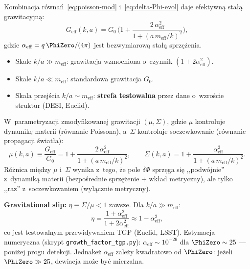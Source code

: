\begin{theorem}\label{thm:Geff-k}
Kombinacja r\'owna\'n~\eqref{eq:poisson-mod}
i~\eqref{eq:delta-Phi-evol} daje efektywn\k{a} sta\l{}\k{a}
grawitacyjn\k{a}:
\begin{equation}\label{eq:Geff-k}
  \boxed{
    G_{\mathrm{eff}}(k, a)
    = G_0\,\biggl(1 + \frac{2\,\alpha_{\mathrm{eff}}^2}
    {1 + (a\,m_{\mathrm{eff}}/k)^2}\biggr),
  }
\end{equation}
gdzie $\alpha_{\mathrm{eff}} = q\,\PhiZero/(4\pi)$ jest
bezwymiarow\k{a} sta\l{}\k{a} sprz\k{e}\.zenia.
\begin{itemize}[nosep]
  \item Skale $k/a \gg m_{\mathrm{eff}}$: grawitacja
        wzmocniona o~czynnik $(1 + 2\alpha_{\mathrm{eff}}^2)$.
  \item Skale $k/a \ll m_{\mathrm{eff}}$: standardowa
        grawitacja $G_0$.
  \item Skala przej\'scia $k/a \sim m_{\mathrm{eff}}$:
        \textbf{strefa testowalna} przez dane o~wzro\'scie
        struktur (DESI, Euclid).
\end{itemize}
\end{theorem}

\begin{corollary}\label{cor:grav-slip}
W~parametryzacji zmodyfikowanej grawitacji $(\mu, \Sigma)$, gdzie
$\mu$ kontroluje dynamik\k{e} materii (r\'ownanie Poissona),
a~$\Sigma$ kontroluje soczewkowanie (r\'ownanie propagacji \'swiat\l{}a):
\begin{equation}\label{eq:mu-sigma}
  \mu(k,a) \equiv \frac{G_{\mathrm{eff}}}{G_0}
  = 1 + \frac{2\,\alpha_{\mathrm{eff}}^2}{1 + (a\,m_{\mathrm{eff}}/k)^2},
  \qquad
  \Sigma(k,a)
  = 1 + \frac{\alpha_{\mathrm{eff}}^2}{1 + (a\,m_{\mathrm{eff}}/k)^2}.
\end{equation}
R\'o\.znica mi\k{e}dzy $\mu$ i~$\Sigma$ wynika z~tego, \.ze pole
$\delta\Phi$ sprz\k{e}ga si\k{e} ,,podw\'ojnie'' z~dynamik\k{a}
materii (bezpo\'srednie sprz\k{e}\.zenie + wk\l{}ad metryczny),
ale tylko ,,raz'' z~soczewkowaniem (wy\l{}\k{a}cznie metryczny).

\textbf{Gravitational slip:}
$\eta \equiv \Sigma/\mu < 1$ zawsze. Dla $k/a \gg m_{\mathrm{eff}}$:
\begin{equation}\label{eq:slip}
  \eta = \frac{1 + \alpha_{\mathrm{eff}}^2}{1 + 2\alpha_{\mathrm{eff}}^2}
  \approx 1 - \alpha_{\mathrm{eff}}^2,
\end{equation}
co jest testowalnym przewidywaniem TGP (Euclid, LSST).
Estymacja numeryczna (skrypt \texttt{growth\_factor\_tgp.py}):
$\alpha_{\mathrm{eff}} \sim 10^{-26}$ dla $\PhiZero \sim 25$
--- poni\.zej progu detekcji. Jednake\.z $\alpha_{\mathrm{eff}}$
zale\.zy kwadratowo od $\PhiZero$: je\.zeli $\PhiZero \gg 25$,
dewiacja mo\.ze by\'c mierzalna.
\end{corollary}

